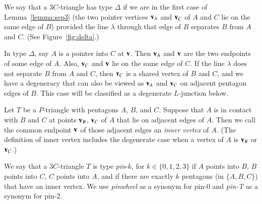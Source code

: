 \begin{definition}[$\Delta$]
  We say that a $3C$-triangle has type $\Delta$ if we are in the first
  case of Lemma~\ref{lemma:sep3} (the two pointer vertices ${\mathbf v}_A$ and
  ${\mathbf v}_C$ of $A$ and $C$ lie on the same edge of $B$) provided the line $\lambda$
  through that edge of $B$ separates $B$ from $A$ and $C$. (See
  Figure~\ref{fig:delta}.)
\end{definition}



In type $\Delta$, say $A$ is a pointer into $C$ at ${\mathbf v}$.  Then ${\mathbf v}_A$
and ${\mathbf v}$ are the two endpoints of some edge of $A$.  Also, ${\mathbf v}_C$ and
${\mathbf v}$ lie on the same edge of $C$.  If the line $\lambda$ does not
separate $B$ from $A$ and $C$, then ${\mathbf v}_C$ is a shared vertex of $B$
and $C$, and we have a degeneracy that can also be viewed as ${\mathbf v}_A$
and ${\mathbf v}_C$ on adjacent pentagon edges of $B$.  This case will be
classified as a degenerate $L$-junction below.

\begin{definition} Let $T$ be a $P$-triangle with pentagons $A$, $B$,
  and $C$.  Suppose that $A$ is in contact with $B$ and $C$ at points
  ${\mathbf v}_B$, ${\mathbf v}_C$ of $A$ that lie on adjacent edges of $A$.  Then we
  call the common endpoint ${\mathbf v}$ of those adjacent edges an {\it inner
    vertex} of $A$.  (The definition of inner vertex includes the
  degenerate case when a vertex of $A$ is ${\mathbf v}_B$ or ${\mathbf v}_C$.)
\end{definition}

\begin{definition} We say that a $3C$-triangle $T$ is type {\it
    pin}-$k$, for $k\in \{0,1,2,3\}$ if $A$ points into $B$, $B$
  points into $C$, $C$ points into $A$, and if there are exactly $k$
  pentagons (in $\{A,B,C\}$) that have an inner vertex.  We use {\it
    pinwheel} as a synonym for pin-$0$ and {\it pin-T} as a synonym
  for pin-$2$.
\end{definition}

